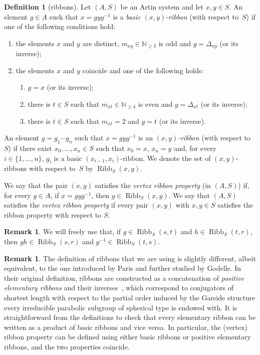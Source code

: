 \documentclass[svgnames]{amsart}
\theoremstyle{plain}
\theoremstyle{definition}
\newtheorem{defn}[thm]{Definition}
\newtheorem{rem}[thm]{Remark}
\newcommand{\ribb}[3]{\operatorname{Ribb}_{#1}(#2,#3)}
\begin{document}
\begin{defn}[ribbons]
    \label{def:ribbon}
    Let $(A,S)$ be an Artin system and let $x,y\in S$. An element $g\in A$ such that $x=gyg^{-1}$ is a \emph{basic $(x,y)$-ribbon} (with respect to~$S$) if one of the following conditions hold:
    \begin{enumerate}
        \item the elements $x$ and $y$ are distinct, $m_{xy}\in\mathbb N_{\ge 3}$ is odd and $g=\Delta_{xy}$ (or its inverse);
        \item the elements $x$ and $y$ coincide and one of the following holds:
        \begin{enumerate}
            \item $g=x$ (or its inverse);
            \item there is $t\in S$ such that $m_{xt}\in\mathbb N_{\ge4}$ is even and $g=\Delta_{xt}$ (or its inverse);
            \item there is $t\in S$ such that $m_{xt} = 2$ and $g=t$ (or its inverse).
        \end{enumerate}
    \end{enumerate}
    An element $g=g_1\cdots g_n$ such that $x=gyg^{-1}$ is an \emph{$(x,y)$-ribbon} (with respect to $S$) if there exist $x_0,\dots, x_{n}\in S$ such that $x_0=x$, $x_{n}=y$ and, for every $i\in\{1,\dots,n\}$, $g_i$ is a basic $(x_{i-1},x_{i})$-ribbon. We denote the set of $(x,y)$-ribbons with respect to~$S$ by $\ribb{S}{x}{y}$.
    
    We say that the pair $(x,y)$ satisfies the \emph{vertex ribbon property} (in $(A,S)$) if, for every $g\in A$, if $x=gyg^{-1}$, then $g\in \ribb{S}{x}{y}$. We say that $(A,S)$ satisfies the \emph{vertex ribbon property} if every pair $(x,y)$ with $x,y\in S$ satisfies the ribbon property with respect to $S$. 
\end{defn}


\begin{rem}
    We will freely use that, if $g \in \ribb{S}{s}{t}$ and $h \in \ribb{S}{t}{r}$, then $gh \in \ribb{S}{s}{r}$ and $g^{-1} \in \ribb{S}{t}{s}$. 
\end{rem}

\begin{rem}\label{rem:basic_and_elm}
    The definition of ribbons that we are using is slightly different, albeit equivalent, to the one introduced by Paris and further studied by Godelle. In their original definition, ribbons are constructed as a concatenation of \emph{positive elementary ribbons} and their inverses~\cite[Definition 0.2]{godelle2003parabolic}, which correspond to conjugators of shortest length with respect to the partial order induced by the Garside structure every irreducible parabolic subgroup of spherical type is endowed with. It is straightforward from the definitions to check that every elementary ribbon can be written as a product of basic ribbons and vice versa. In particular, the (vertex) ribbon property can be defined using either basic ribbons or positive elementary ribbons, and the two properties coincide.
\end{rem}
\end{document}
